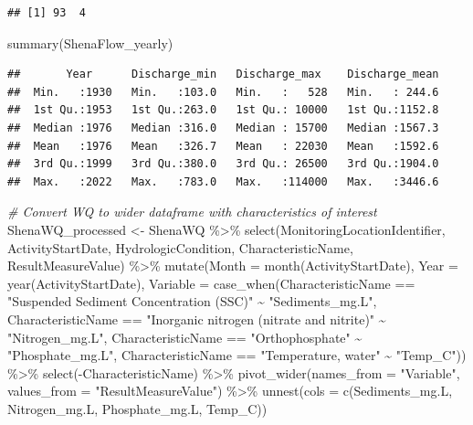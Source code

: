 \documentclass[
  12pt,
]{article}
\newenvironment{Shaded}{\begin{snugshade}}{\end{snugshade}}
\newcommand{\AttributeTok}[1]{\textcolor[rgb]{0.77,0.63,0.00}{#1}}
\newcommand{\CommentTok}[1]{\textcolor[rgb]{0.56,0.35,0.01}{\textit{#1}}}
\newcommand{\FunctionTok}[1]{\textcolor[rgb]{0.00,0.00,0.00}{#1}}
\newcommand{\NormalTok}[1]{#1}
\newcommand{\OtherTok}[1]{\textcolor[rgb]{0.56,0.35,0.01}{#1}}
\newcommand{\SpecialCharTok}[1]{\textcolor[rgb]{0.00,0.00,0.00}{#1}}
\newcommand{\StringTok}[1]{\textcolor[rgb]{0.31,0.60,0.02}{#1}}
\begin{document}
\begin{verbatim}
## [1] 93  4
\end{verbatim}

\begin{Shaded}
\begin{Highlighting}[]
\FunctionTok{summary}\NormalTok{(ShenaFlow\_yearly)}
\end{Highlighting}
\end{Shaded}

\begin{verbatim}
##       Year      Discharge_min   Discharge_max    Discharge_mean  
##  Min.   :1930   Min.   :103.0   Min.   :   528   Min.   : 244.6  
##  1st Qu.:1953   1st Qu.:263.0   1st Qu.: 10000   1st Qu.:1152.8  
##  Median :1976   Median :316.0   Median : 15700   Median :1567.3  
##  Mean   :1976   Mean   :326.7   Mean   : 22030   Mean   :1592.6  
##  3rd Qu.:1999   3rd Qu.:380.0   3rd Qu.: 26500   3rd Qu.:1904.0  
##  Max.   :2022   Max.   :783.0   Max.   :114000   Max.   :3446.6
\end{verbatim}

\begin{Shaded}
\begin{Highlighting}[]
\CommentTok{\# Convert WQ to wider dataframe with characteristics of interest}
\NormalTok{ShenaWQ\_processed }\OtherTok{\textless{}{-}}\NormalTok{ ShenaWQ }\SpecialCharTok{\%\textgreater{}\%}
  \FunctionTok{select}\NormalTok{(MonitoringLocationIdentifier, ActivityStartDate, HydrologicCondition,}
\NormalTok{         CharacteristicName, ResultMeasureValue) }\SpecialCharTok{\%\textgreater{}\%}
  \FunctionTok{mutate}\NormalTok{(}\AttributeTok{Month =} \FunctionTok{month}\NormalTok{(ActivityStartDate),}
         \AttributeTok{Year =} \FunctionTok{year}\NormalTok{(ActivityStartDate),}
         \AttributeTok{Variable =} \FunctionTok{case\_when}\NormalTok{(CharacteristicName }\SpecialCharTok{==} \StringTok{"Suspended Sediment Concentration (SSC)"} \SpecialCharTok{\textasciitilde{}} \StringTok{"Sediments\_mg.L"}\NormalTok{,}
\NormalTok{                              CharacteristicName }\SpecialCharTok{==} \StringTok{"Inorganic nitrogen (nitrate and nitrite)"} \SpecialCharTok{\textasciitilde{}} \StringTok{"Nitrogen\_mg.L"}\NormalTok{,}
\NormalTok{                              CharacteristicName }\SpecialCharTok{==} \StringTok{"Orthophosphate"} \SpecialCharTok{\textasciitilde{}} \StringTok{"Phosphate\_mg.L"}\NormalTok{,}
\NormalTok{                              CharacteristicName }\SpecialCharTok{==} \StringTok{"Temperature, water"} \SpecialCharTok{\textasciitilde{}} \StringTok{"Temp\_C"}\NormalTok{)) }\SpecialCharTok{\%\textgreater{}\%}
  \FunctionTok{select}\NormalTok{(}\SpecialCharTok{{-}}\NormalTok{CharacteristicName) }\SpecialCharTok{\%\textgreater{}\%}
  \FunctionTok{pivot\_wider}\NormalTok{(}\AttributeTok{names\_from =} \StringTok{"Variable"}\NormalTok{, }\AttributeTok{values\_from =} \StringTok{"ResultMeasureValue"}\NormalTok{) }\SpecialCharTok{\%\textgreater{}\%}
  \FunctionTok{unnest}\NormalTok{(}\AttributeTok{cols =} \FunctionTok{c}\NormalTok{(Sediments\_mg.L, Nitrogen\_mg.L, Phosphate\_mg.L, Temp\_C))}
\end{Highlighting}
\end{Shaded}
\end{document}
